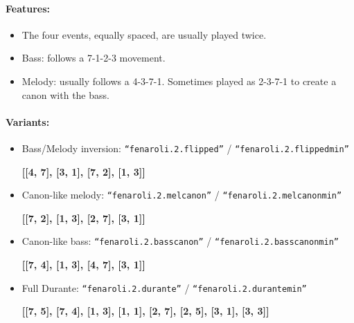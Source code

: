 ﻿\documentclass[11pt, openany]{article}
\begin{document}
\paragraph{Features:}
\begin{itemize}
\item The four events, equally spaced, are usually played twice.
\item Bass: follows a 7-1-2-3 movement.
\item Melody: usually follows a 4-3-7-1. Sometimes played as 2-3-7-1 to create a canon with the bass.
\end{itemize}

\paragraph{Variants:}
\begin{itemize}
\item Bass/Melody inversion: \texttt{“fenaroli.2.flipped”} / \texttt{“fenaroli.2.flippedmin”}
	\begin{center}
	\textbf{[[4, 7], [3, 1], [7, 2], [1, 3]]}
	\end{center}
\item Canon-like melody: \texttt{“fenaroli.2.melcanon”} / \texttt{“fenaroli.2.melcanonmin”}
	\begin{center}
	\textbf{[[7, 2], [1, 3], [2, 7], [3, 1]]}
	\end{center}
\item Canon-like bass: \texttt{“fenaroli.2.basscanon”} / \texttt{“fenaroli.2.basscanonmin”}
	\begin{center}
	\textbf{[[7, 4], [1, 3], [4, 7], [3, 1]]}
	\end{center}
\item Full Durante: \texttt{“fenaroli.2.durante”} / \texttt{“fenaroli.2.durantemin”}
	\begin{center}
	\textbf{[[7, 5], [7, 4], [1, 3], [1, 1], [2, 7], [2, 5], [3, 1], [3, 3]]}
	\end{center}
\end{itemize}
\end{document}

